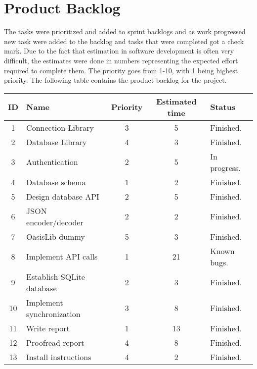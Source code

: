 \section{Product Backlog}
The tasks were prioritized and added to sprint backlogs and as work progressed new task were added to the backlog and tasks that were completed got a check mark. Due to the fact that estimation in software development is often very difficult, the estimates were done in numbers representing the expected effort required to complete them. The priority goes from 1-10, with 1 being highest priority. The following table contains the product backlog for the project.

\begin{center}
	\begin{tabular}{| c | p{4cm} | c | c | l |}
	\hline
	\textbf{ID} 	& \textbf{Name} 										& \textbf{Priority} 	& \textbf{Estimated time} 	& \textbf{Status} 			\\ 	\hline
	1 	& Connection Library 						& 3 		& 5 				& Finished. 		\\	\hline
	2 	& Database Library 							& 4 		& 3 				& Finished. 		\\	\hline
	3 	& Authentication 							& 2 		& 5 				& In progress. 		\\ 	\hline
	4 	& Database schema 							& 1 		& 2 				& Finished. 		\\	\hline
	5 	& Design database API 						& 2 		& 5 				& Finished. 		\\	\hline
	6 	& JSON encoder/decoder 						& 2 		& 2 				& Finished. 		\\	\hline
	7 	& OasisLib dummy							& 5 		& 3 				& Finished. 		\\	\hline
	8 	& Implement API calls						& 1 		& 21 				& Known bugs. 		\\ 		\hline
	9 	& Establish SQLite database 				& 2 		& 3 				& Finished. 		\\	\hline
	10	& Implement synchronization					& 3 		& 8 				& Finished. 		\\	\hline
	11	& Write report								& 1 		& 13 				& Finished. 		\\	\hline
	12	& Proofread report 							& 4 		& 8 				& Finished. 		\\ 	\hline
	13	& Install instructions 						& 4 		& 2 				& Finished. 		\\	\hline
	\end{tabular}
\end{center}